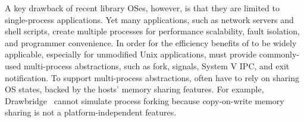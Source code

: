

A key drawback of recent library OSes, however,
is that they are limited to single-process applications.
Yet many applications, such as network servers and
shell scripts,
create multiple processes
for
performance scalability, fault isolation, and programmer convenience.
In order for the efficiency benefits of \liboses{} to be widely applicable,
especially for unmodified Unix applications,
\liboses{} must  provide commonly-used multi-process abstractions,
such as fork,  signals, System V IPC, and exit notification.
To support multi-process abstractions, \liboses{} often have to rely on sharing OS states,
backed by the hosts' memory sharing features.
For example, Drawbridge~\citep{porter11drawbridge} cannot simulate process forking because copy-on-write memory sharing is not a platform-independent features.



